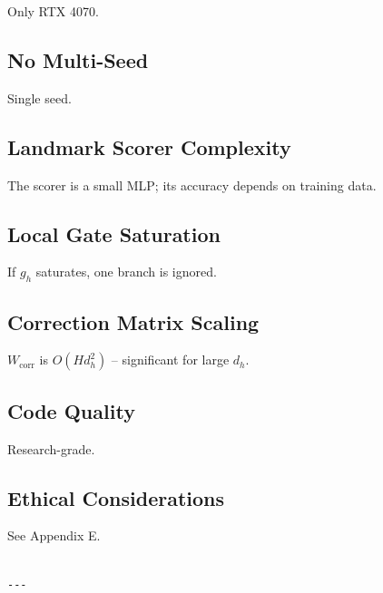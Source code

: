Only RTX 4070.

\subsection{No Multi-Seed}

Single seed.

\subsection{Landmark Scorer Complexity}

The scorer is a small MLP; its accuracy depends on training data.

\subsection{Local Gate Saturation}

If $g_h$ saturates, one branch is ignored.

\subsection{Correction Matrix Scaling}

$W_\text{corr}$ is $O(H d_h^2)$ -- significant for large $d_h$.

\subsection{Code Quality}

Research-grade.

\subsection{Ethical Considerations}

See Appendix E.
\begin{lstlisting}

---
\end{lstlisting}